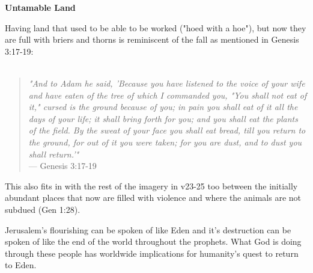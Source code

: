 \documentclass[11pt]{article}
\begin{document}
\vspace{3em}
{\large\bfseries Untamable Land}
\vspace{1em}

Having land that used to be able to be worked ("hoed with a hoe"), but now they are full with briers and thorns is reminiscent of the fall as mentioned in Genesis 3:17-19:
\\\\
\begin{quote}
\textit{"And to Adam he said, 'Because you have listened to the voice of your wife and have eaten of the tree of which I commanded you, "You shall not eat of it," cursed is the ground because of you; in pain you shall eat of it all the days of your life;  it shall bring forth for you; and you shall eat the plants of the field. By the sweat of your face you shall eat bread, till you return to the ground, for out of it you were taken; for you are dust, and to dust you shall return.'"} \\
\hfill --- Genesis 3:17-19
\end{quote}
\vspace{1em}

This also fits in with the rest of the imagery in v23-25 too between the initially abundant places that now are filled with violence and where the animals are not subdued (Gen 1:28).

Jerusalem's flourishing can be spoken of like Eden and it's destruction can be spoken of like the end of the world throughout the prophets. What God is doing through these people has worldwide implications for humanity's quest to return to Eden.
\end{document}

